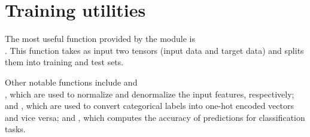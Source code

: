 \section{Training utilities}

The most useful function provided by the  module is\\. This function takes as input two tensors (input data and target data) and splits them into training and test sets.

Other notable functions include  and\\, which are used to normalize and denormalize the input features, respectively;  and , which are used to convert categorical labels into one-hot encoded vectors and vice versa; and , which computes the accuracy of predictions for classification tasks.
